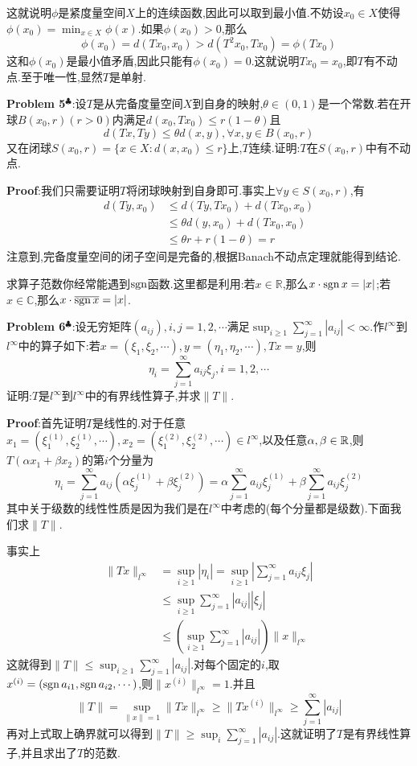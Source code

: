 这就说明$\phi$是紧度量空间$X$上的连续函数,因此可以取到最小值.不妨设$x_0\in X$使得$\phi(x_0)=\min_{x\in X}\phi(x)$.如果$\phi(x_0)>0$,那么
$$
\phi(x_0)=d(Tx_0,x_0)>d(T^2x_0,Tx_0)=\phi(Tx_0)
$$
这和$\phi(x_0)$是最小值矛盾,因此只能有$\phi(x_0)=0$.这就说明$Tx_0=x_0$,即$T$有不动点.至于唯一性,显然$T$是单射.\par
\textbf{Problem 5}$^\clubsuit $:设$T$是从完备度量空间$X$到自身的映射,$\theta\in (0,1)$是一个常数.若在开球$B(x_0,r)(r>0)$内满足$d(x_0,Tx_0)\leqslant r(1-\theta)$且
$$
d(Tx,Ty)\leqslant \theta d(x,y),\forall x,y\in B(x_0,r)
$$
又在闭球$S(x_0,r)=\{x\in X:d(x,x_0)\leqslant r\}$上,$T$连续.证明:$T$在$S(x_0,r)$中有不动点.\par
\textbf{Proof}:我们只需要证明$T$将闭球映射到自身即可.事实上$\forall y\in S(x_0,r)$,有
$$
\begin{aligned}
    d(Ty,x_0) &\leqslant d(Ty,Tx_0)+d(Tx_0,x_0)\\
              &\leqslant \theta d(y,x_0)+d(Tx_0,x_0)\\
              &\leqslant \theta r+r(1-\theta)=r
\end{aligned}
$$
注意到,完备度量空间的闭子空间是完备的,根据Banach不动点定理就能得到结论.\par
求算子范数你经常能遇到$\operatorname{sgn}$函数.这里都是利用:若$x\in\mathbb{R}$,那么$x\cdot\operatorname{sgn} x=|x|$;若$x\in\mathbb{C}$,那么$x\cdot\overline{\operatorname{sgn} x}=|x|$.\par
\textbf{Problem 6}$^\clubsuit $:设无穷矩阵$(a_{ij}),i,j=1,2,\cdots$满足$\sup_{i\geqslant 1}\sum_{j=1}^{\infty}|a_{ij}|<\infty$.作$l^{\infty}$到$l^{\infty}$中的算子如下:若$x=(\xi_1,\xi_2,\cdots),y=(\eta_1,\eta_2,\cdots),Tx=y$,则
$$
\eta_i=\sum_{j=1}^{\infty}a_{ij}\xi_j,i=1,2,\cdots
$$
证明:$T$是$l^{\infty}$到$l^{\infty}$中的有界线性算子,并求$\|T\|$.\par
\textbf{Proof}:首先证明$T$是线性的.对于任意$x_1=(\xi_1^{(1)},\xi_2^{(1)},\cdots),x_2=(\xi_1^{(2)},\xi_2^{(2)},\cdots)\in l^{\infty}$,以及任意$\alpha,\beta\in \mathbb{R}$,则$T(\alpha x_1+\beta x_2)$的第$i$个分量为
$$
\eta_i=\sum_{j=1}^{\infty}a_{ij}(\alpha \xi_j^{(1)}+\beta \xi_j^{(2)})=\alpha \sum_{j=1}^{\infty}a_{ij}\xi_j^{(1)}+\beta \sum_{j=1}^{\infty}a_{ij}\xi_j^{(2)}
$$
其中关于级数的线性性质是因为我们是在$l^{\infty}$中考虑的(每个分量都是级数).下面我们求$\|T\|$.\par
事实上
$$
\begin{aligned}
    \|Tx\|_{l^{\infty}} &= \sup_{i\geqslant 1}|\eta_i|=\sup_{i\geqslant 1}\left|\sum_{j=1}^{\infty}a_{ij}\xi_j\right|\\
                       &\leqslant \sup_{i\geqslant 1}\sum_{j=1}^{\infty}|a_{ij}||\xi_j|\\
                       &\leqslant \left(\sup_{i\geqslant 1}\sum_{j=1}^{\infty}|a_{ij}|\right)\|x\|_{l^{\infty}}
\end{aligned}
$$
这就得到$\|T\|\leqslant \sup_{i\geqslant 1}\sum_{j=1}^{\infty}|a_{ij}|$.对每个固定的$i$,取$x^{(i)}=(\operatorname{sgn} a_{i1},\operatorname{sgn} a_{i2},\cdots)$,则$\|x^{(i)}\|_{l^{\infty}}=1$.并且
$$
\|T\|=\sup_{\|x\|=1}\|Tx\|_{l^{\infty}}\geqslant \|Tx^{(i)}\|_{l^{\infty}}\geqslant \sum_{j=1}^{\infty}|a_{ij}|
$$
再对上式取上确界就可以得到$\|T\|\geqslant \sup_{i}\sum_{j=1}^{\infty}|a_{ij}|$.这就证明了$T$是有界线性算子,并且求出了$T$的范数.\par

